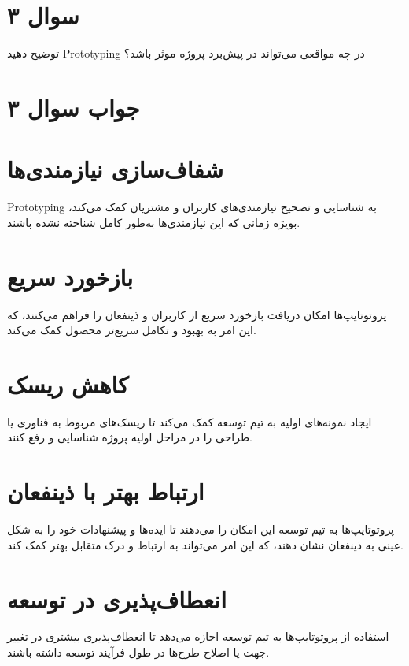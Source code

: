 \section*{سوال ۳}

توضیح دهید Prototyping در چه مواقعی می‌تواند در پیش‌برد پروژه موثر باشد؟

\section*{جواب سوال ۳}

\section*{شفاف‌سازی نیازمندی‌ها}
Prototyping به شناسایی و تصحیح نیازمندی‌های کاربران و مشتریان کمک می‌کند، بویژه زمانی که این نیازمندی‌ها به‌طور کامل شناخته نشده باشند.

\section*{بازخورد سریع}
پروتوتایپ‌ها امکان دریافت بازخورد سریع از کاربران و ذینفعان را فراهم می‌کنند، که این امر به بهبود و تکامل سریع‌تر محصول کمک می‌کند.

\section*{کاهش ریسک}
ایجاد نمونه‌های اولیه به تیم توسعه کمک می‌کند تا ریسک‌های مربوط به فناوری یا طراحی را در مراحل اولیه پروژه شناسایی و رفع کنند.

\section*{ارتباط بهتر با ذینفعان}
پروتوتایپ‌ها به تیم توسعه این امکان را می‌دهند تا ایده‌ها و پیشنهادات خود را به شکل عینی به ذینفعان نشان دهند، که این امر می‌تواند به ارتباط و درک متقابل بهتر کمک کند.

\section*{انعطاف‌پذیری در توسعه}
استفاده از پروتوتایپ‌ها به تیم توسعه اجازه می‌دهد تا انعطاف‌پذیری بیشتری در تغییر جهت یا اصلاح طرح‌ها در طول فرآیند توسعه داشته باشند.
